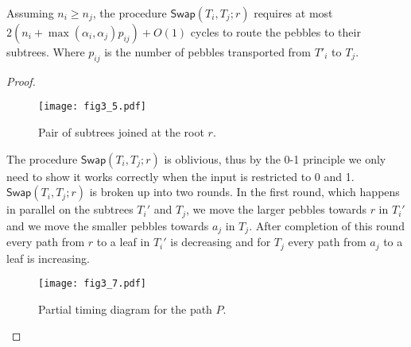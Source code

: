 \documentclass[runningheads,a4paper]{llncs}
\begin{document}
\begin{lemma}
	Assuming $n_i \ge n_j$, the procedure $\mathsf{Swap}(T_i,T_{j};r)$ requires  at most $2(n_i + \max(\alpha_i,\alpha_j)p_{ij}) + O(1)$ cycles to route the pebbles to their subtrees. Where $p_{ij}$ is the number of pebbles transported from $T'_i$ to $T_j$.
\end{lemma}

\begin{proof}
	\begin{figure}[h]
		\texttt{[image: fig3\_5.pdf]}
		\centering
		\caption{Pair of subtrees joined at the root $r$.} 
	\end{figure}
	The procedure $\mathsf{Swap}(T_i,T_{j};r)$ is oblivious, thus by the 0-1 principle \cite{12} we only need to show it works correctly when the input is restricted to 0 and 1. $\mathsf{Swap}(T_i,T_{j};r)$  is broken up into two rounds. In the first round, which happens in parallel on the subtrees $T_i'$ and $T_j$, we move the larger  pebbles towards $r$ in $T_i'$ and we move the smaller pebbles towards $a_j$ in $T_j$. After completion of this round every path from $r$ to a leaf in $T_i'$ is  decreasing and for $T_j$ every path from $a_j$  to a leaf is increasing.
	\begin{figure}[h]
		\texttt{[image: fig3\_7.pdf]}
		\centering
		\caption{Partial timing diagram for the path $P$. } 
	\end{figure}
	

\end{proof}
\end{document}
